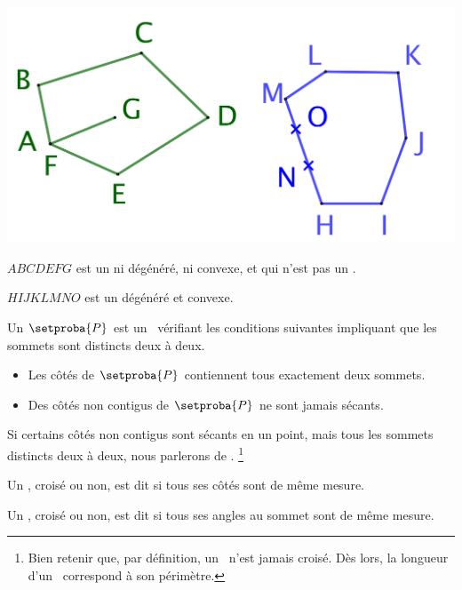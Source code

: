 \begin{center}
	\small\itshape\centering
	\includegraphics[scale=.35]{content/polygon/def/degenerated-ncycles.png}
	
	\smallskip
	$ABCDEFG$ est un  ni dégénéré, ni convexe, et qui n'est pas un \ngone.
	
	\smallskip
	$HIJKLMNO$ est un  dégénéré et convexe.
\end{center}




\newpage %


\begin{defi}
	Un \focus{\ngone} $\setproba{P}$ est un \ncycle\ vérifiant les conditions suivantes impliquant que les sommets sont distincts deux à deux.
	\begin{itemize}
		\item Les côtés de $\setproba{P}$ contiennent tous exactement deux sommets.

		\item Des côtés non contigus de $\setproba{P}$ ne sont jamais sécants.
	\end{itemize}


	Si certains côtés non contigus sont sécants en un point, mais tous les sommets distincts deux à deux, nous parlerons de .%
	\footnote{
		Bien retenir que, par définition, un \ngone\ n'est jamais croisé.
		Dès lors, la longueur d'un \ngone\ correspond à son périmètre.
	}
\end{defi}


\begin{defi}
	Un \ngone, croisé ou non, est dit  si tous ses côtés sont de même mesure.
\end{defi}


\begin{defi}
	Un \ngone, croisé ou non, est dit  si tous ses angles au sommet sont de même mesure.
\end{defi}


